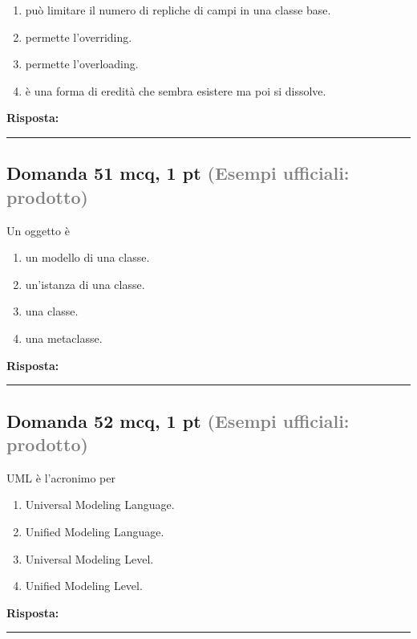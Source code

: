 \documentclass[a4paper,11pt]{article}
\begin{document}
\begin{enumerate}[label=\alph*)]
\item può limitare il numero di repliche di campi in una classe base.
\item permette l'overriding.
\item permette l'overloading.
\item è una forma di eredità che sembra esistere ma poi si dissolve.
\end{enumerate}
\vspace{0.2cm}
\noindent\textbf{Risposta:}\par
\vspace{1.5cm}\hrule


\subsection*{Domanda 51 \hfill {\small mcq, 1 pt \textcolor{gray}{(Esempi ufficiali: prodotto)}}}
Un oggetto è

\begin{enumerate}[label=\alph*)]
\item un modello di una classe.
\item un'istanza di una classe.
\item una classe.
\item una metaclasse.
\end{enumerate}
\vspace{0.2cm}
\noindent\textbf{Risposta:}\par
\vspace{1.5cm}\hrule


\subsection*{Domanda 52 \hfill {\small mcq, 1 pt \textcolor{gray}{(Esempi ufficiali: prodotto)}}}
UML è l'acronimo per

\begin{enumerate}[label=\alph*)]
\item Universal Modeling Language.
\item Unified Modeling Language.
\item Universal Modeling Level.
\item Unified Modeling Level.
\end{enumerate}
\vspace{0.2cm}
\noindent\textbf{Risposta:}\par
\vspace{1.5cm}\hrule
\end{document}
